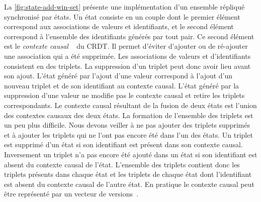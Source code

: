 La \autoref{fig:state-add-win-set} présente une implémentation d'un ensemble répliqué synchronisé par états.
Un état consiste en un couple dont le premier élément correspond aux associations de valeurs et identifiants, et le second élément correspond à l'ensemble des identifiants générés par tout pair.
Ce second élément est le \emph{contexte causal }~\autocite{almeida_2018_delta-crdt-revisited} du \ac{CRDT}.
Il permet d'éviter d'ajouter ou de ré-ajouter une association qui a été supprimée.
Les associations de valeurs et d'identifiants consistent en des triplets.
La suppression d'un triplet peut donc avoir lieu avant son ajout.
L'état généré par l'ajout d'une valeur correspond à l'ajout d'un nouveau triplet et de son identifiant au contexte causal.
L'état généré par la suppression d'une valeur ne modifie pas le contexte causal et retire les triplets correspondants.
Le contexte causal résultant de la fusion de deux états est l'union des contextes causaux des deux états.
La formation de l'ensemble des triplets est un peu plus difficile.
Nous devons veiller à ne pas ajouter des triplets supprimés et à ajouter les triplets qui ne l'ont pas encore été dans l'un des états.
Un triplet est supprimé d'un état si son identifiant est présent dans son contexte causal.
Inversement un triplet n'a pas encore été ajouté dans un état si son identifiant est absent du contexte causal de l'état.
L'ensemble des triplets contient donc les triplets présents dans chaque état et les triplets de chaque état dont l'identifiant est absent du contexte causal de l'autre état.
En pratique le contexte causal peut être représenté par un vecteur de versions~\autocite{parker_1983_versionvector,mattern_1988_timevector}.

